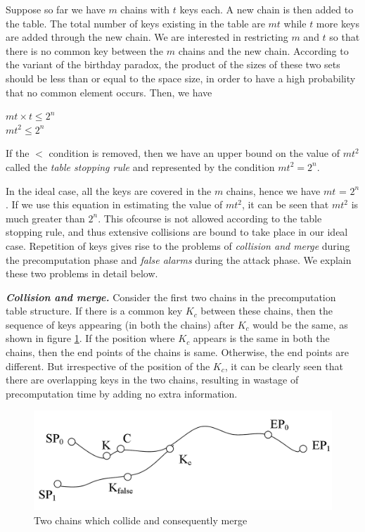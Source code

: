 \begin{enumerate}
Suppose so far we have $m$ chains with $t$ keys each. A new chain is then added to the table. The total number of keys existing in the table are $mt$ while $t$ more keys are added through the new chain. We are interested in restricting $m$ and $t$ so that there is no common key between the $m$ chains and the new chain. According to the variant of the birthday paradox, the product of the sizes of these two sets should be less than or equal to the space size, in order to have a high probability that no common element occurs. Then, we have 

\begin{center}
$mt \times t \leq 2^n$\\
$mt^2 \leq 2^n$\\
\end{center}

If the $<$ condition is removed, then we have an upper bound on the value of $mt^2$ called the \emph{table stopping rule} and represented by the condition 
$mt^2 = 2^n$. 

In the ideal case, all the keys are covered in the $m$ chains, hence we have $mt$ = $2^n$. If we use this equation in estimating the value of $mt^2$, it can be seen that $mt^2$ is much greater than $2^n$. This ofcourse is not allowed according to the table stopping rule, and thus extensive collisions are bound to take place in our ideal case. Repetition of keys gives rise to the problems of \emph{collision and merge} during the precomputation phase and \emph{false alarms} during the attack phase. We explain these two problems in detail below.
\end{enumerate}

\noindent  \textit{\textbf{Collision and merge.}} Consider the first two chains in the precomputation table structure. If there is a common key $K_c$ between these chains, then the sequence of keys appearing (in both the chains) after $K_c$ would be the same, as shown in figure \ref{fig:collision-merge}. If the position where $K_c$ appears is the same in both the chains, then the end points of the chains is same. Otherwise, the end points are different. But irrespective of the position of the $K_c$, it can be clearly seen that there are overlapping keys in the two chains, resulting in wastage of precomputation time by adding no extra information.\\

\begin{figure}[ht!]
	\centering
		\includegraphics[width=4.5in]{./figures/collision-merge.PNG}
	\caption{Two chains which collide and consequently merge}	
	\label{fig:collision-merge}
\end{figure}

